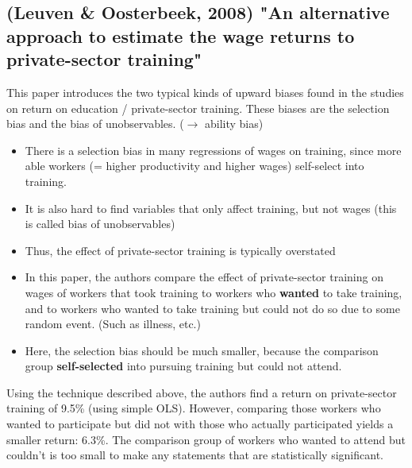 \documentclass[12pt,a4paper]{article}
\begin{document}
  \subsection{(Leuven \& Oosterbeek, 2008) "An alternative approach to estimate the wage returns to private-sector training"} %
  \label{sub:}
  This paper introduces the two typical kinds of upward biases found in the studies on return on education / private-sector training. These biases
  are the selection bias and the bias of unobservables. ($\rightarrow$ ability bias)
  \begin{itemize}
    \item There is a selection bias in many regressions of wages on training, since more able workers (= higher productivity and higher wages) self-select into training.
    \item It is also hard to find variables that only affect training, but not wages (this is called bias of unobservables)
    \item Thus, the effect of private-sector training is typically overstated
    \item In this paper, the authors compare the effect of private-sector training on wages of workers that took training to workers who \textbf{wanted} to take training, and to workers
          who wanted to take training but could not do so due to some random event. (Such as illness, etc.)
    \item Here, the selection bias should be much smaller, because the comparison group \textbf{self-selected} into pursuing training
          but could not attend. 
  \end{itemize}
  Using the technique described above, the authors find a return on private-sector training of 9.5\% (using simple OLS). 
  However, comparing those workers who wanted to participate but did not with those who actually participated yields a
  smaller return: 6.3\%. The comparison group of workers who wanted to attend but couldn't is too small to make any
  statements that are statistically significant.
\end{document}
